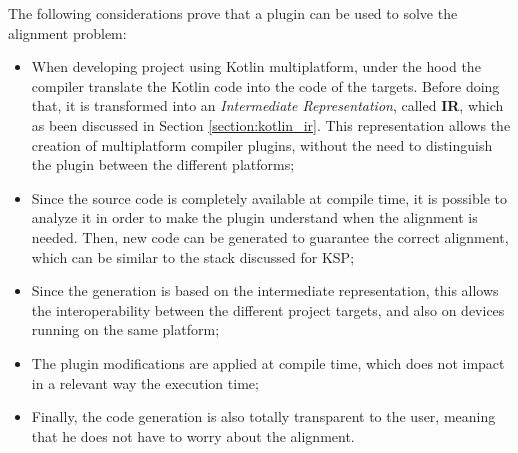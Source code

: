 The following considerations prove that a plugin can be used to solve the alignment problem:
\begin{itemize}
    \item When developing project using Kotlin multiplatform, under the hood the compiler translate the Kotlin code into the code of the targets. Before doing that, it is transformed into an \textit{Intermediate Representation}, called \textbf{IR}, which as been discussed in Section \ref{section:kotlin_ir}. This representation allows the creation of multiplatform compiler plugins, without the need to distinguish the plugin between the different platforms;
    \item Since the source code is completely available at compile time, it is possible to analyze it in order to make the plugin understand when the alignment is needed. Then, new code can be generated to guarantee the correct alignment, which can be similar to the stack discussed for KSP; 
    \item Since the generation is based on the intermediate representation, this allows the interoperability between the different project targets, and also on devices running on the same platform;
    \item The plugin modifications are applied at compile time, which does not impact in a relevant way the execution time;
    \item Finally, the code generation is also totally transparent to the user, meaning that he does not have to worry about the alignment.
\end{itemize}


